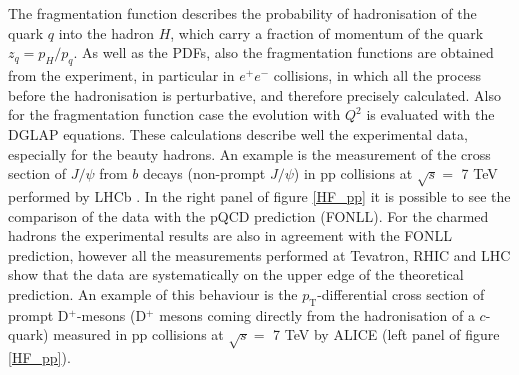 \documentclass[b5paper,10pt,twoside,oldstyle,classica]{toptesi}
\newcommand{\pt}{p_\text{T}}
\begin{document}
\\\\
The fragmentation function describes the probability of hadronisation of the quark $q$ into the hadron $H$, which carry a fraction of
momentum of the quark $z_q = p_H/p_q$. As well as the PDFs, also the fragmentation functions are obtained from the experiment, in particular in $e^+e^-$ collisions, in which all the process before the hadronisation is perturbative, and therefore precisely calculated. Also for the fragmentation function case the evolution with $Q^2$ is evaluated with the DGLAP equations. These calculations describe well the experimental data, especially for the beauty hadrons. An example is the measurement of the cross section of $J/\psi$ from $b$ decays (non-prompt $J/\psi$) in pp collisions at $\sqrt{s} =$ 7 TeV performed by LHCb \cite{Aaij:2011jh}. In the right panel of figure \ref{HF_pp} it is possible to see the comparison of the data with the pQCD prediction (FONLL).
For the charmed hadrons the experimental results are also in agreement with the FONLL prediction, however all the measurements performed at Tevatron, RHIC and LHC show that the data are systematically on the upper edge of the theoretical prediction. An example of this behaviour is the $\pt$-differential cross section of prompt D$^+$-mesons (D$^+$ mesons coming directly from the hadronisation of a $c$-quark) measured in pp collisions at $\sqrt{s} =$ 7 TeV by ALICE \cite{ALICE:2011aa} (left panel of figure \ref{HF_pp}).
\end{document}
